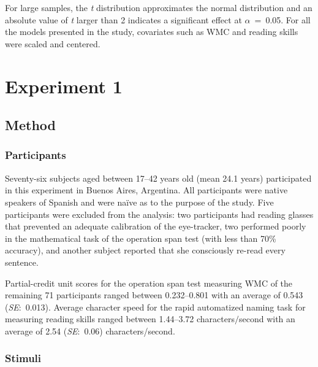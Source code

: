 \documentclass{frontiersSCNS}\usepackage{knitr}
\begin{document}
For large samples, the \textit{t} distribution approximates the normal distribution and an absolute value of \textit{t} larger than 2 indicates a significant effect at $\alpha$~=~0.05. 
For all the models presented in the study, covariates such as WMC and reading skills were scaled and centered. 






\section{Experiment 1} 



\subsection{Method}
\subsubsection{Participants}


Seventy-six subjects aged between 17--42 years old (mean 24.1 years)  participated in this experiment in Buenos Aires, Argentina.  All participants were native speakers of Spanish and were na\"{i}ve as to the purpose of the study. Five participants were excluded from the analysis: two participants had reading glasses that prevented an adequate calibration of the eye-tracker, two performed poorly in the mathematical task of the operation span test (with less than 70\% accuracy), and another subject reported that she consciously re-read every sentence.



Partial-credit unit scores \citep{ConwayEtAl2005} for the operation span test measuring WMC of the remaining 71 participants ranged between 0.232--0.801 with an average of 0.543 (\textit{SE}:~0.013). Average character speed for the rapid automatized naming task for measuring reading skills ranged between 1.44--3.72 characters$/$second with an average of 2.54 (\textit{SE}:~0.06) characters/second.


\subsubsection{Stimuli}
\end{document}
